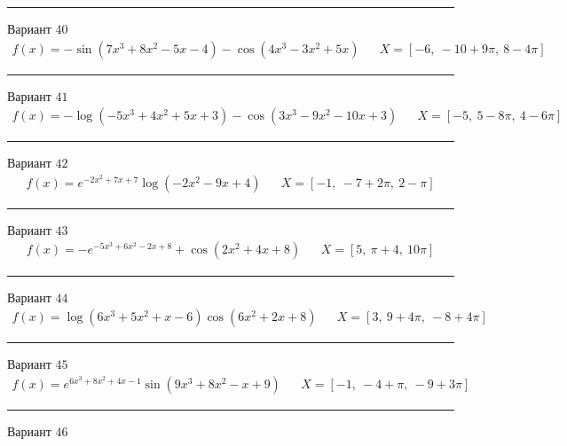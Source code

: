 \documentclass[11pt]{report}
\begin{document}
\begin{center}
    \noindent\rule{8cm}{0.4pt}
\end{center}
Вариант \(40\)
\begin{align*}
    f(x) = - \sin{\left(7 x^{3} + 8 x^{2} - 5 x - 4 \right)} - \cos{\left(4 x^{3} - 3 x^{2} + 5 x \right)} && X = \left[ -6, \  -10 + 9 \pi, \  8 - 4 \pi\right]
\end{align*}
\begin{center}
    \noindent\rule{8cm}{0.4pt}
\end{center}
Вариант \(41\)
\begin{align*}
    f(x) = - \log{\left(- 5 x^{3} + 4 x^{2} + 5 x + 3 \right)} - \cos{\left(3 x^{3} - 9 x^{2} - 10 x + 3 \right)} && X = \left[ -5, \  5 - 8 \pi, \  4 - 6 \pi\right]
\end{align*}
\begin{center}
    \noindent\rule{8cm}{0.4pt}
\end{center}
Вариант \(42\)
\begin{align*}
    f(x) = e^{- 2 x^{2} + 7 x + 7} \log{\left(- 2 x^{2} - 9 x + 4 \right)} && X = \left[ -1, \  -7 + 2 \pi, \  2 - \pi\right]
\end{align*}
\begin{center}
    \noindent\rule{8cm}{0.4pt}
\end{center}
Вариант \(43\)
\begin{align*}
    f(x) = - e^{- 5 x^{3} + 6 x^{2} - 2 x + 8} + \cos{\left(2 x^{2} + 4 x + 8 \right)} && X = \left[ 5, \  \pi + 4, \  10 \pi\right]
\end{align*}
\begin{center}
    \noindent\rule{8cm}{0.4pt}
\end{center}
Вариант \(44\)
\begin{align*}
    f(x) = \log{\left(6 x^{3} + 5 x^{2} + x - 6 \right)} \cos{\left(6 x^{2} + 2 x + 8 \right)} && X = \left[ 3, \  9 + 4 \pi, \  -8 + 4 \pi\right]
\end{align*}
\begin{center}
    \noindent\rule{8cm}{0.4pt}
\end{center}
Вариант \(45\)
\begin{align*}
    f(x) = e^{6 x^{3} + 8 x^{2} + 4 x - 1} \sin{\left(9 x^{3} + 8 x^{2} - x + 9 \right)} && X = \left[ -1, \  -4 + \pi, \  -9 + 3 \pi\right]
\end{align*}
\begin{center}
    \noindent\rule{8cm}{0.4pt}
\end{center}
Вариант \(46\)
\end{document}
